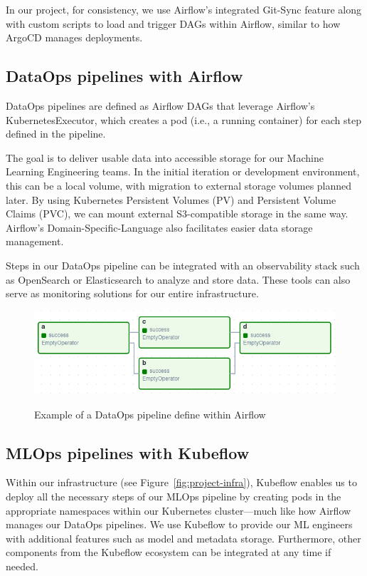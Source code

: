 In our project, for consistency, we use Airflow’s integrated Git-Sync feature along with custom scripts to load and trigger DAGs within Airflow,
similar to how ArgoCD manages deployments.


\subsection{DataOps pipelines with Airflow}\label{subsec:dataops-pipelines2}
DataOps pipelines are defined as Airflow DAGs that leverage Airflow’s KubernetesExecutor, which creates a pod (i.e., a running container) for each step defined in the pipeline.

The goal is to deliver usable data into accessible storage for our Machine Learning Engineering teams.
In the initial iteration or development environment, this can be a local volume, with migration to external storage volumes planned later.
By using Kubernetes Persistent Volumes (PV) and Persistent Volume Claims (PVC), we can mount external S3-compatible storage in the same way.
Airflow’s Domain-Specific-Language also facilitates easier data storage management.

Steps in our DataOps pipeline can be integrated with an observability stack such as OpenSearch or Elasticsearch to analyze and store data.
These tools can also serve as monitoring solutions for our entire infrastructure.

\begin{figure}[!htbp]
    \centering
    \caption{Example of a DataOps pipeline define within Airflow}
    \includegraphics[scale=0.5]{images/project/data-ops-airflow-dag}
    \label{fig:project-data-ops-airflow-dag}
\end{figure}

\subsection{MLOps pipelines with Kubeflow}\label{subsec:mlops-pipelines2}
Within our infrastructure (see Figure~\ref{fig:project-infra}), Kubeflow enables us to deploy all the necessary steps of our MLOps pipeline by creating pods in the appropriate namespaces within our Kubernetes cluster—much like how Airflow manages our DataOps pipelines.
We use Kubeflow to provide our ML engineers with additional features such as model and metadata storage.
Furthermore, other components from the Kubeflow ecosystem can be integrated at any time if needed.

